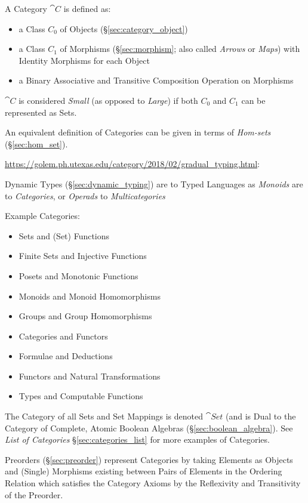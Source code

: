 A Category $\cat{C}$ is defined as:
\begin{itemize}
\item a Class $C_0$ of Objects (\S\ref{sec:category_object})
\item a Class $C_1$ of Morphisms (\S\ref{sec:morphism}; also called
  \emph{Arrows} or \emph{Maps}) with Identity Morphisms for each
  Object
\item a Binary Associative and Transitive Composition Operation on
  Morphisms
\end{itemize}
$\cat{C}$ is considered \emph{Small} (as opposed to \emph{Large})
if both $C_0$ and $C_1$ can be represented as Sets.

An equivalent definition of Categories can be given in terms of
\emph{Hom-sets} (\S\ref{sec:hom_set}).

\url{https://golem.ph.utexas.edu/category/2018/02/gradual_typing.html}:

Dynamic Types (\S\ref{sec:dynamic_typing}) are to Typed Languages as
\emph{Monoids} are to \emph{Categories}, or \emph{Operads} to
\emph{Multicategories}

\asterism

Example Categories:
\begin{itemize}
\item Sets and (Set) Functions
\item Finite Sets and Injective Functions
\item Posets and Monotonic Functions
\item Monoids and Monoid Homomorphisms
\item Groups and Group Homomorphisms
\item Categories and Functors
\item Formulae and Deductions
\item Functors and Natural Transformations
\item Types and Computable Functions
\end{itemize}
The Category of all Sets and Set Mappings is denoted $\cat{Set}$
(and is Dual to the Category of Complete, Atomic Boolean Algebras
(\S\ref{sec:boolean_algebra}). See \emph{List of Categories}
\S\ref{sec:categories_list} for more examples of Categories.

Preorders (\S\ref{sec:preorder}) represent Categories by taking
Elements as Objects and (Single) Morphisms existing between Pairs of
Elements in the Ordering Relation which satisfies the Category Axioms
by the Reflexivity and Transitivity of the Preorder.

